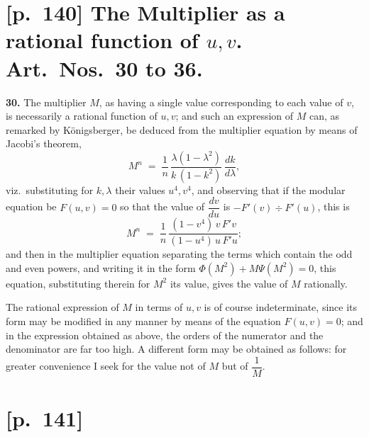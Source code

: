 \documentclass[11pt]{article}
\begin{document}
\section*{[p.~140] The Multiplier as a rational function of $u, v$. Art.\ Nos.\ 30 to 36.}

\textbf{30.} The multiplier $M$, as having a single value corresponding to
each value of $v$, is necessarily a rational function of $u, v$; and such
an expression of $M$ can, as remarked by K\"onigsberger, be deduced from
the multiplier equation by means of Jacobi's theorem,
\[
M^n \;=\; \frac{1}{n}\,\frac{\lambda(1 - \lambda^2)}{k\,(1 - k^2)}\,\frac{dk}{d\lambda},
\]
viz.\ substituting for $k, \lambda$ their values $u^4, v^4$, and observing
that if the modular equation be $F(u, v) = 0$ so that the value of
$\dfrac{dv}{du}$ is $-F'(v) \div F'(u)$, this is
\[
M^n \;=\; \frac{1}{n}\,\frac{(1 - v^4)\,v\, F'v}{(1 - u^4)\,u\, F'u};
\]
and then in the multiplier equation separating the terms which contain the
odd and even powers, and writing it in the form
$\Phi(M^2) + M\Psi(M^2) = 0$, this equation, substituting therein for $M^2$
its value, gives the value of $M$ rationally.

The rational expression of $M$ in terms of $u, v$ is of course
indeterminate, since its form may be modified in any manner by means of the
equation $F(u, v) = 0$; and in the expression obtained as above, the orders
of the numerator and the denominator are far too high. A different form
may be obtained as follows: for greater convenience I seek for the value
not of $M$ but of $\dfrac{1}{M}$.

\section*{[p.~141]}
\end{document}
